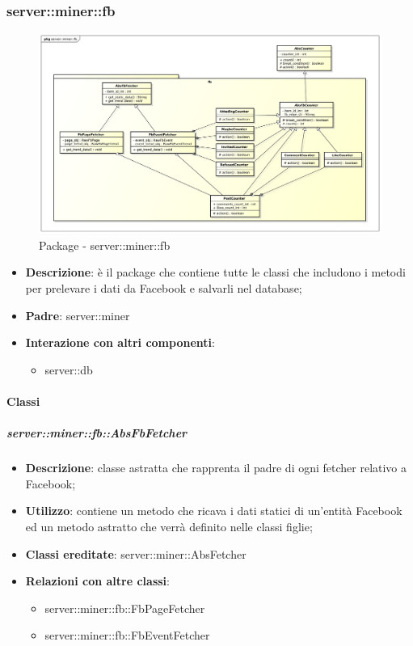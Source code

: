 \subsubsection{server::miner::fb} %
\label{ssub:bdsm_app_server_miner_fb}
\begin{figure}[htbp]
	\centering
	\centerline{\includegraphics[scale=0.3]{./images/server/miner_fb.pdf}}
	\caption{Package - server::miner::fb}
\end{figure}

\begin{itemize}
  \item \textbf{Descrizione}: è il package che contiene tutte le classi che includono i metodi per prelevare i dati da Facebook e salvarli nel database;
  \item \textbf{Padre}: server::miner
  \item \textbf{Interazione con altri componenti}:
  	\begin{itemize}
  		\item server::db
  	\end{itemize}
\end{itemize}

	\paragraph{Classi} %
		\subparagraph{server::miner::fb::AbsFbFetcher} %
		\label{subp:server_miner_fb_AbsFbFetcher}
			\begin{itemize}
				\item \textbf{Descrizione}: classe astratta che rapprenta il padre di ogni fetcher relativo a Facebook;
				\item \textbf{Utilizzo}: contiene un metodo che ricava i dati statici di un'entità Facebook ed un metodo astratto che verrà definito nelle classi figlie;
				\item \textbf{Classi ereditate}: server::miner::AbsFetcher
				\item \textbf{Relazioni con altre classi}:
					\begin{itemize}
						\item server::miner::fb::FbPageFetcher
						\item server::miner::fb::FbEventFetcher
					\end{itemize}
			\end{itemize}

